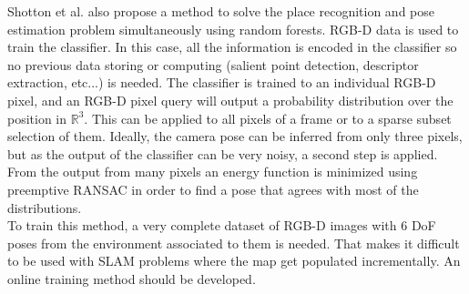 Shotton et al. \cite{Shotton2013} also propose a method to solve the place recognition and pose estimation problem simultaneously using random forests. RGB-D data is used to train the classifier. In this case, all the information is encoded in the classifier so no previous data storing or computing (salient point detection, descriptor extraction, etc...) is needed. The classifier is trained to an individual RGB-D pixel, and an RGB-D pixel query will output a probability distribution over the position in $\mathbb{R}^3$. This can be applied to all pixels of a frame or to a sparse subset selection of them. Ideally, the camera pose can be inferred from only three pixels, but as the output of the classifier can be very noisy, a second step is applied. From the output from many pixels an energy function is minimized using preemptive RANSAC in order to find a pose that agrees with most of the distributions.\\

To train this method, a very complete dataset of RGB-D images with 6 DoF poses from the environment associated to them is needed. That makes it difficult to be used with SLAM problems where the map get populated incrementally. An online training  method should be developed.\\
